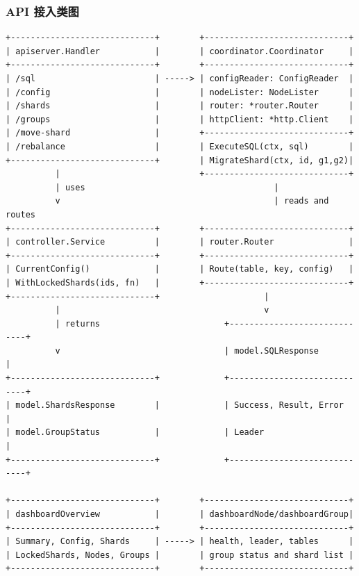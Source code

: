 \documentclass[UTF8,a4paper,12pt]{ctexart}
\begin{document}
\subsubsection{API 接入类图}

\begin{lstlisting}[style=asciiart,caption={API 接入与 Dashboard 聚合类图}]
+-----------------------------+        +-----------------------------+
| apiserver.Handler           |        | coordinator.Coordinator     |
+-----------------------------+        +-----------------------------+
| /sql                        | -----> | configReader: ConfigReader  |
| /config                     |        | nodeLister: NodeLister      |
| /shards                     |        | router: *router.Router      |
| /groups                     |        | httpClient: *http.Client    |
| /move-shard                 |        +-----------------------------+
| /rebalance                  |        | ExecuteSQL(ctx, sql)        |
+-----------------------------+        | MigrateShard(ctx, id, g1,g2)|
          |                            +-----------------------------+
          | uses                                      |
          v                                           | reads and routes
+-----------------------------+        +-----------------------------+
| controller.Service          |        | router.Router               |
+-----------------------------+        +-----------------------------+
| CurrentConfig()             |        | Route(table, key, config)   |
| WithLockedShards(ids, fn)   |        +-----------------------------+
+-----------------------------+                     |
          |                                         v
          | returns                         +-----------------------------+
          v                                 | model.SQLResponse           |
+-----------------------------+             +-----------------------------+
| model.ShardsResponse        |             | Success, Result, Error      |
| model.GroupStatus           |             | Leader                      |
+-----------------------------+             +-----------------------------+

+-----------------------------+        +-----------------------------+
| dashboardOverview           |        | dashboardNode/dashboardGroup|
+-----------------------------+        +-----------------------------+
| Summary, Config, Shards     | -----> | health, leader, tables      |
| LockedShards, Nodes, Groups |        | group status and shard list |
+-----------------------------+        +-----------------------------+
\end{lstlisting}
\end{document}
